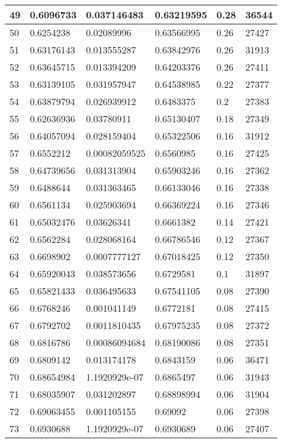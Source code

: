 \begin{longtable}{|l|l|l|l|l|l|}
49 & 0.6096733 & 0.037146483 & 0.63219595 & 0.28 & 36544 \\ \hline 
50 & 0.6254238 & 0.02089996 & 0.63566995 & 0.26 & 27427 \\ \hline 
51 & 0.63176143 & 0.013555287 & 0.63842976 & 0.26 & 31913 \\ \hline 
52 & 0.63645715 & 0.013394209 & 0.64203376 & 0.26 & 27411 \\ \hline 
53 & 0.63139105 & 0.031957947 & 0.64538985 & 0.22 & 27377 \\ \hline 
54 & 0.63879794 & 0.026939912 & 0.6483375 & 0.2 & 27383 \\ \hline 
55 & 0.62636936 & 0.03780911 & 0.65130407 & 0.18 & 27349 \\ \hline 
56 & 0.64057094 & 0.028159404 & 0.65322506 & 0.16 & 31912 \\ \hline 
57 & 0.6552212 & 0.00082059525 & 0.6560985 & 0.16 & 27425 \\ \hline 
58 & 0.64739656 & 0.031313904 & 0.65903246 & 0.16 & 27362 \\ \hline 
59 & 0.6488644 & 0.031363465 & 0.66133046 & 0.16 & 27338 \\ \hline 
60 & 0.6561134 & 0.025903694 & 0.66369224 & 0.16 & 27346 \\ \hline 
61 & 0.65032476 & 0.03626341 & 0.6661382 & 0.14 & 27421 \\ \hline 
62 & 0.6562284 & 0.028068164 & 0.66786546 & 0.12 & 27367 \\ \hline 
63 & 0.6698902 & 0.0007777127 & 0.67018425 & 0.12 & 27350 \\ \hline 
64 & 0.65920043 & 0.038573656 & 0.6729581 & 0.1 & 31897 \\ \hline 
65 & 0.65821433 & 0.036495633 & 0.67541105 & 0.08 & 27390 \\ \hline 
66 & 0.6768246 & 0.001041149 & 0.6772181 & 0.08 & 27415 \\ \hline 
67 & 0.6792702 & 0.0011810435 & 0.67975235 & 0.08 & 27372 \\ \hline 
68 & 0.6816786 & 0.00086094684 & 0.68190086 & 0.08 & 27351 \\ \hline 
69 & 0.6809142 & 0.013174178 & 0.6843159 & 0.06 & 36471 \\ \hline 
70 & 0.68654984 & 1.1920929e-07 & 0.6865497 & 0.06 & 31943 \\ \hline 
71 & 0.68035907 & 0.031202897 & 0.68898994 & 0.06 & 31904 \\ \hline 
72 & 0.69063455 & 0.001105155 & 0.69092 & 0.06 & 27398 \\ \hline 
73 & 0.6930688 & 1.1920929e-07 & 0.6930689 & 0.06 & 27407 \\ \hline 

\end{longtable}
